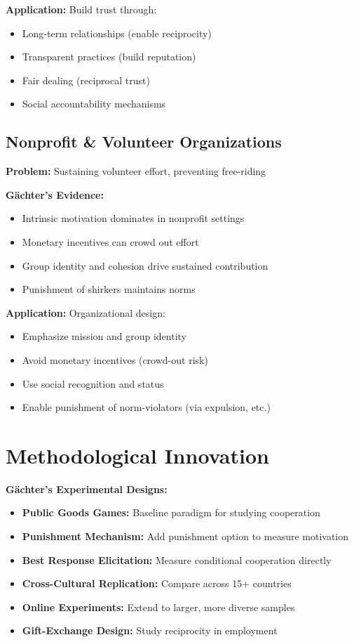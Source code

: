 \documentclass[11pt]{article}
\begin{document}
\textbf{Application:} Build trust through:
\begin{itemize}
    \item Long-term relationships (enable reciprocity)
    \item Transparent practices (build reputation)
    \item Fair dealing (reciprocal trust)
    \item Social accountability mechanisms
\end{itemize}

\subsection*{Nonprofit \& Volunteer Organizations}

\textbf{Problem:} Sustaining volunteer effort, preventing free-riding

\textbf{Gächter's Evidence:}
\begin{itemize}
    \item Intrinsic motivation dominates in nonprofit settings
    \item Monetary incentives can crowd out effort
    \item Group identity and cohesion drive sustained contribution
    \item Punishment of shirkers maintains norms
\end{itemize}

\textbf{Application:} Organizational design:
\begin{itemize}
    \item Emphasize mission and group identity
    \item Avoid monetary incentives (crowd-out risk)
    \item Use social recognition and status
    \item Enable punishment of norm-violators (via expulsion, etc.)
\end{itemize}

\section*{Methodological Innovation}

\textbf{Gächter's Experimental Designs:}

\begin{itemize}
    \item \textbf{Public Goods Games:} Baseline paradigm for studying cooperation
    \item \textbf{Punishment Mechanism:} Add punishment option to measure motivation
    \item \textbf{Best Response Elicitation:} Measure conditional cooperation directly
    \item \textbf{Cross-Cultural Replication:} Compare across 15+ countries
    \item \textbf{Online Experiments:} Extend to larger, more diverse samples
    \item \textbf{Gift-Exchange Design:} Study reciprocity in employment
\end{itemize}
\end{document}
